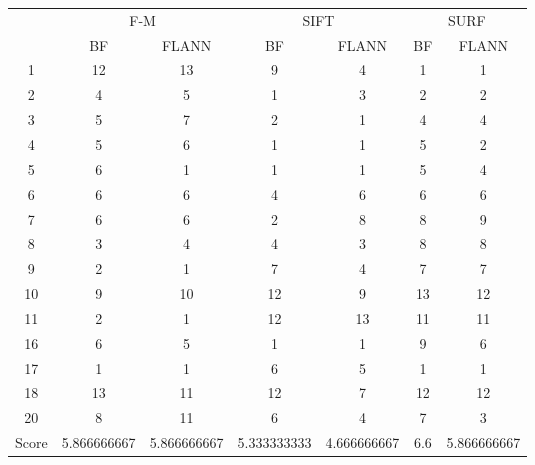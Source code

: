 \documentclass[draft,final]{vutinfth} %
\begin{document}
\begin{minipage}{\linewidth}
\centering
\begin{tabular}{ccccccc}
& \multicolumn{2}{c}{ F-M } & \multicolumn{2}{c}{ SIFT } & \multicolumn{2}{c}{ SURF } \\
& BF & FLANN & BF & FLANN & BF & FLANN \\
1 & 12 & 13 & 9 & 4 & 1 & 1 \\
2 & 4 & 5 & 1 & 3 & 2 & 2 \\
3 & 5 & 7 & 2 & 1 & 4 & 4 \\
4 & 5 & 6 & 1 & 1 & 5 & 2 \\
5 & 6 & 1 & 1 & 1 & 5 & 4 \\
6 & 6 & 6 & 4 & 6 & 6 & 6 \\
7 & 6 & 6 & 2 & 8 & 8 & 9 \\
8 & 3 & 4 & 4 & 3 & 8 & 8 \\
9 & 2 & 1 & 7 & 4 & 7 & 7 \\
10 & 9 & 10 & 12 & 9 & 13 & 12 \\
11 & 2 & 1 & 12 & 13 & 11 & 11 \\
16 & 6 & 5 & 1 & 1 & 9 & 6 \\
17 & 1 & 1 & 6 & 5 & 1 & 1 \\
18 & 13 & 11 & 12 & 7 & 12 & 12 \\
20 & 8 & 11 & 6 & 4 & 7 & 3 \\
Score & 5.866666667 & 5.866666667 & 5.333333333 & 4.666666667 & 6.6 & 5.866666667 \\
\end{tabular}
 \label{tab:BL} 
\end{minipage}
\end{document}
